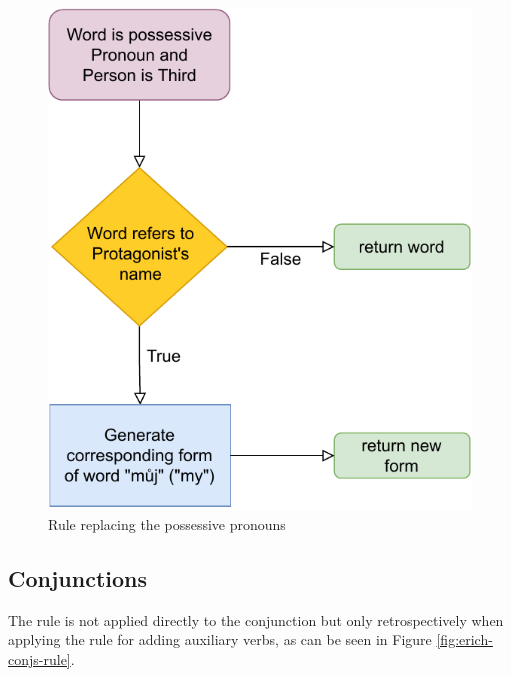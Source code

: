\begin{figure}[!htbp]
\includegraphics[]{data/Erich-Posspron-Rule.pdf}
\caption{Rule replacing the possessive pronouns}
\label{fig:erich-posspron-rule}
\end{figure}

\subsection{Conjunctions}

The rule is not applied directly to the conjunction but only retrospectively when applying the rule for adding auxiliary verbs, as can be seen in Figure \ref{fig:erich-conjs-rule}.

